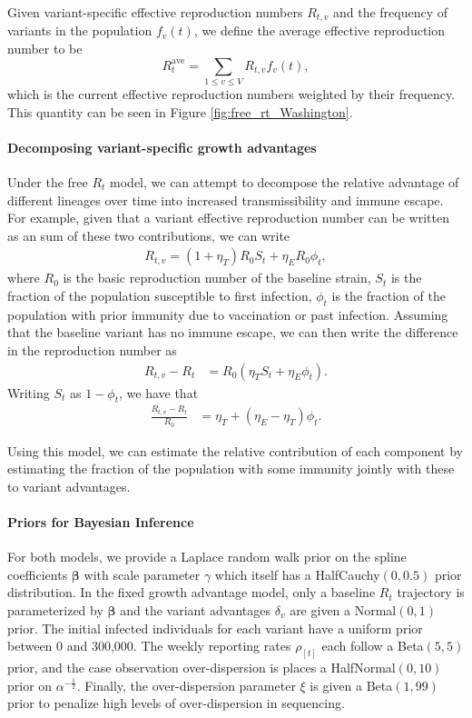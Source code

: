 \documentclass[11pt,oneside,letterpaper]{article}
\renewcommand{\vec}[1]{\boldsymbol{#1}}
\begin{document}
Given variant-specific effective reproduction numbers $R_{t,v}$ and the frequency of variants in the population $f_{v}(t)$, we define the average effective reproduction number to be
\begin{equation}
  R_{t}^{\text{ave}} = \sum_{1\leq v \leq V} R_{t,v}f_{v}(t),
\end{equation}
which is the current effective reproduction numbers weighted by their frequency. This quantity can be seen in Figure \ref{fig:free_rt_Washington}.

\paragraph{Decomposing variant-specific growth advantages}%

Under the free $R_{t}$ model, we can attempt to decompose the relative advantage of different lineages over time into increased transmissibility and immune escape. For example, given that a variant effective reproduction number can be written as an sum of these two contributions, we can write
\begin{align*}
  R_{t,v} = (1+\eta_{T}) R_{0} S_{t} + \eta_{E} R_{0} \phi_{t},
\end{align*}
where $R_{0}$ is the basic reproduction number of the baseline strain, $S_{t}$ is the fraction of the population susceptible to first infection, $\phi_{t}$ is the fraction of the population with prior immunity due to vaccination or past infection. Assuming that the baseline variant has no immune escape, we can then write the difference in the reproduction number as
\begin{align*}
  R_{t,v} - R_{t} &= R_{0} (\eta_{T} S_{t} + \eta_{E} \phi_{t}).
\end{align*}
Writing $S_{t}$ as $1 - \phi_{t}$, we have that
\begin{align*}
  \frac{R_{t,v}-R_{t}}{R_{0}} &= \eta_{T} + (\eta_{E} - \eta_{T})\phi_{t}.
\end{align*}

Using this model, we can estimate the relative contribution of each component by estimating the fraction of the population with some immunity jointly with these to variant advantages.

\paragraph{Priors for Bayesian Inference}%

For both models, we provide a Laplace random walk prior on the spline coefficients $\vec{\beta}$ with scale parameter $\gamma$ which itself has a HalfCauchy$(0,0.5)$ prior distribution.
In the fixed growth advantage model, only a baseline $R_{t}$ trajectory is parameterized by $\vec{\beta}$ and the variant advantages $\delta_{v}$ are given a Normal$(0,1)$ prior.
The initial infected individuals for each variant have a uniform prior between 0 and 300,000.
The weekly reporting rates $\rho_{[t]}$ each follow a Beta$(5, 5)$ prior, and the case observation over-dispersion is places a HalfNormal$(0, 10)$ prior on $\alpha^{-\frac{1}{2}}$.
Finally, the over-dispersion parameter $\xi$ is given a Beta$(1, 99)$ prior to penalize high levels of over-dispersion in sequencing.
\end{document}

